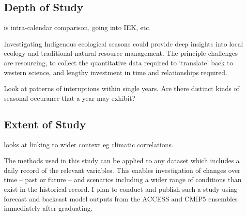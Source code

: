\subsection{Depth of Study}
is intra-calendar comparison, going into IEK, etc.

Investigating Indigenous ecological seasons could provide deep insights
into local ecology and traditional natural resource management.
The principle challenges are resourcing, to collect the quantitative
data required to `translate' back to western science, and lengthy
investment in time and relationships required.

Look at patterns of interuptions within single years.  Are there distinct
kinds of seasonal occurance that a year may exhibit?



\subsection{Extent of Study}
looks at linking to wider context eg climatic correlations.

The methods used in this study can be applied to any dataset which
includes a daily record of the relevant variables.  This enables
investigation of changes over time -- past or future -- and scenarios
including a wider range of conditions than exist in the historical record.
I plan to conduct and publish such a study using forecast and backcast
model outputs from the ACCESS and CMIP5 ensembles immediately
after graduating.


